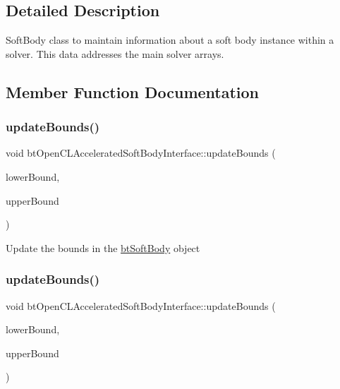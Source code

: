\subsection{Detailed Description}
Soft\+Body class to maintain information about a soft body instance within a solver. This data addresses the main solver arrays. 

\subsection{Member Function Documentation}
\mbox{\label{classbtOpenCLAcceleratedSoftBodyInterface_a4ffffc49b4b4c0512de11a8884154fe9}} 
\subsubsection{\texorpdfstring{update\+Bounds()}{updateBounds()}\hspace{0.1cm}{\footnotesize\ttfamily [1/2]}}
{\footnotesize\ttfamily void bt\+Open\+C\+L\+Accelerated\+Soft\+Body\+Interface\+::update\+Bounds (\begin{DoxyParamCaption}\item[{const bt\+Vector3 \&}]{lower\+Bound,  }\item[{const bt\+Vector3 \&}]{upper\+Bound }\end{DoxyParamCaption})}

Update the bounds in the \hyperlink{classbtSoftBody}{bt\+Soft\+Body} object \mbox{\label{classbtOpenCLAcceleratedSoftBodyInterface_a4ffffc49b4b4c0512de11a8884154fe9}} 
\subsubsection{\texorpdfstring{update\+Bounds()}{updateBounds()}\hspace{0.1cm}{\footnotesize\ttfamily [2/2]}}
{\footnotesize\ttfamily void bt\+Open\+C\+L\+Accelerated\+Soft\+Body\+Interface\+::update\+Bounds (\begin{DoxyParamCaption}\item[{const bt\+Vector3 \&}]{lower\+Bound,  }\item[{const bt\+Vector3 \&}]{upper\+Bound }\end{DoxyParamCaption})}

